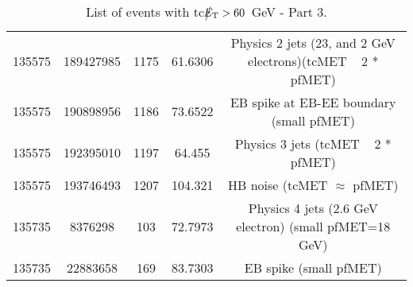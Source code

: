 \begin{table}[htbp]
\begin{center}
\begin{tabular}{|c|c|c|c|c|}
      135575  & 189427985    & 1175 &    61.6306 & Physics 2 jets (23, and 2 GeV electrons)(tcMET ~ 2 * pfMET) \\
      135575  & 190898956    & 1186 &    73.6522 & EB spike at EB-EE boundary (small pfMET) \\
      135575  & 192395010    & 1197 &    64.455  & Physics 3 jets (tcMET ~ 2 * pfMET) \\
      135575  & 193746493    & 1207 &    104.321 & HB noise (tcMET $\approx$ pfMET) \\
      135735  & 8376298      & 103  &    72.7973 & Physics 4 jets (2.6 GeV electron) (small pfMET=18 GeV) \\
      135735  & 22883658     & 169  &    83.7303 & EB spike (small pfMET) \\       
      \hline
    \end{tabular}
    \caption{List of events with tc$\big\slash\hspace{-1.6ex}{E_\text{T}}>60$~GeV - Part 3.}        
    \label{tab:tcMETlist3}
  \end{center}
\end{table}




